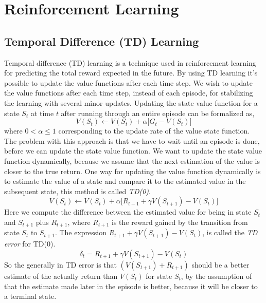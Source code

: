 \documentclass[11pt]{article}
\begin{document}
\maketitle

\section{Reinforcement Learning}



\subsection{Temporal Difference (TD) Learning}

Temporal difference (TD) learning is a technique used in reinforcement learning for predicting the total reward expected in the future. By using TD learning it's possible to update the value functions after each time step. We wish to update the value functions after each time step, instead of each episode, for stabilizing the learning with several minor updates. Updating the state value function for a state $S_{t}$ at time $t$ after running through an entire episode can be formalized as,
\begin{equation}\label{eq:td}
    V(S_{t}) \leftarrow V(S_{t}) + \alpha \big[G_{t} - V(S_{t}) \big]
\end{equation}
where $0 < \alpha \leq 1$ corresponding to the update rate of the value state function. The problem with this approach is that we have to wait until an episode is done, before we can update the state value function. We want to update the state value function dynamically, because we assume that the next estimation of the value is closer to the true return. One way for updating the value function dynamically is to estimate the value of a state and compare it to the estimated value in the subsequent state, this method is called \textit{TD(0)}.
\begin{equation}\label{eq:td2}
    V(S_{t}) \leftarrow V(S_{t}) + \alpha \big[R_{t + 1} + \gamma V(S_{t + 1}) - V(S_{t}) \big]
\end{equation}
Here we compute the difference between the estimated value for being in state $S_{t}$ and $S_{t + 1}$ plus $R_{t + 1}$, where $R_{t + 1}$ is the reward gained by the transition from state $S_{t}$ to $S_{t + 1}$. The expression $R_{t + 1} + \gamma V(S_{t + 1}) - V(S_{t})$, is called the \textit{TD error} for TD(0).
\begin{equation}
    \delta_{t} = R_{t + 1} + \gamma V(S_{t + 1}) - V(S_{t})
\end{equation}
So the generally in TD error is that $(V(S_{t + 1}) + R_{t + 1})$ should be a better estimate of the actually return than $V(S_{t})$ for state $S_{t}$, by the assumption of that the estimate made later in the episode is better, because it will be closer to a terminal state.  
\end{document}
